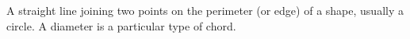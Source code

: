 A straight line joining two points on the perimeter (or edge) of
a shape, usually a circle. A diameter is a particular
type of chord.